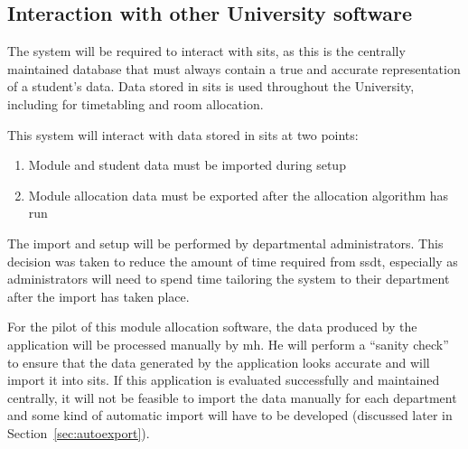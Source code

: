 \documentclass[twoside,draft]{scrartcl}
\begin{document}
\subsection{Interaction with other University software}

The system will be required to interact with \gls{sits}, as this is the
centrally maintained database that must always contain a true and accurate
representation of a student's data. Data stored in \gls{sits} is used throughout
the University, including for timetabling and room allocation.

This system will interact with data stored in \gls{sits} at two points:

\begin{enumerate}
  \item Module and student data must be imported during setup
  \item Module allocation data must be exported after the allocation algorithm has run
\end{enumerate}

The import and setup will be performed by departmental administrators. This
decision was taken to reduce the amount of time required from \gls{ssdt},
especially as administrators will need to spend time tailoring the system to
their department after the import has taken place.

For the pilot of this module allocation software, the data produced by the
application will be processed manually by \gls{mh}. He will perform a ``sanity
check'' to ensure that the data generated by the application looks accurate
and will import it into \gls{sits}. If this application is evaluated
successfully and maintained centrally, it will not be feasible to import the
data manually for each department and some kind of automatic import will have
to be developed (discussed later in Section~\ref{sec:autoexport}).
















\end{document}
